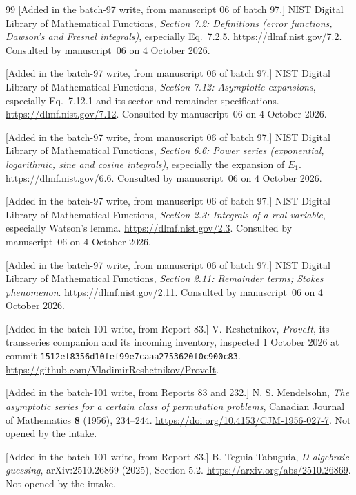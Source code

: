 \documentclass[11pt]{article}
\numberwithin{equation}{section}
\theoremstyle{definition}
\theoremstyle{remark}
\theoremstyle{definition}
\begin{document}
\begin{thebibliography}{99}
[Added in the batch-97 write, from manuscript 06 of batch 97.] NIST Digital
Library of Mathematical Functions, \emph{Section 7.2: Definitions (error
functions, Dawson's and Fresnel integrals)}, especially Eq.~7.2.5.
\url{https://dlmf.nist.gov/7.2}. Consulted by manuscript~06 on 4 October 2026.

[Added in the batch-97 write, from manuscript 06 of batch 97.] NIST Digital
Library of Mathematical Functions, \emph{Section 7.12: Asymptotic
expansions}, especially Eq.~7.12.1 and its sector and remainder
specifications. \url{https://dlmf.nist.gov/7.12}. Consulted by manuscript~06
on 4 October 2026.

[Added in the batch-97 write, from manuscript 06 of batch 97.] NIST Digital
Library of Mathematical Functions, \emph{Section 6.6: Power series
(exponential, logarithmic, sine and cosine integrals)}, especially the
expansion of $E_1$. \url{https://dlmf.nist.gov/6.6}. Consulted by
manuscript~06 on 4 October 2026.

[Added in the batch-97 write, from manuscript 06 of batch 97.] NIST Digital
Library of Mathematical Functions, \emph{Section 2.3: Integrals of a real
variable}, especially Watson's lemma. \url{https://dlmf.nist.gov/2.3}.
Consulted by manuscript~06 on 4 October 2026.

[Added in the batch-97 write, from manuscript 06 of batch 97.] NIST Digital
Library of Mathematical Functions, \emph{Section 2.11: Remainder terms;
Stokes phenomenon}. \url{https://dlmf.nist.gov/2.11}. Consulted by
manuscript~06 on 4 October 2026.
\begingroup\raggedright
[Added in the batch-101 write, from Report 83.] V. Reshetnikov,
\emph{ProveIt}, its transseries companion
\allowbreak
{} and its incoming inventory,
inspected 1 October 2026 at commit
\nolinkurl{1512ef8356d10fef99e7caaa2753620f0c900c83}.
\url{https://github.com/VladimirReshetnikov/ProveIt}.\par\endgroup

[Added in the batch-101 write, from Reports 83 and 232.] N. S. Mendelsohn,
\emph{The asymptotic series for a certain class of permutation problems},
Canadian Journal of Mathematics \textbf{8} (1956), 234--244.
\url{https://doi.org/10.4153/CJM-1956-027-7}. Not opened by the intake.

[Added in the batch-101 write, from Report 83.] B. Teguia Tabuguia,
\emph{D-algebraic guessing}, arXiv:2510.26869 (2025), Section 5.2.
\url{https://arxiv.org/abs/2510.26869}. Not opened by the intake.


\end{thebibliography}
\end{document}
